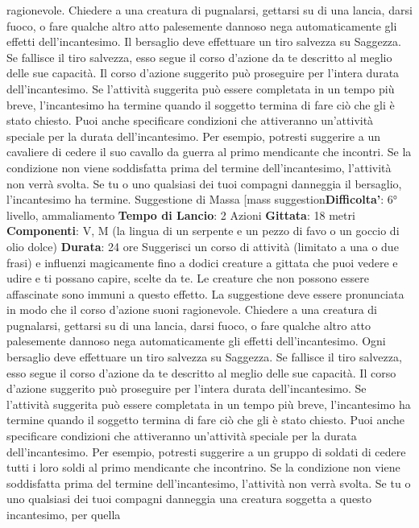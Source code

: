\begin{multicols}{2}
ragionevole. Chiedere a una creatura di pugnalarsi,
gettarsi su di una lancia, darsi fuoco, o fare qualche
altro atto palesemente dannoso nega automaticamente
gli effetti dell’incantesimo.
Il bersaglio deve effettuare un tiro salvezza su
Saggezza. Se fallisce il tiro salvezza, esso segue il
corso d’azione da te descritto al meglio delle sue
capacità. Il corso d’azione suggerito può proseguire per
l’intera durata dell’incantesimo. Se l’attività suggerita
può essere completata in un tempo più breve,
l’incantesimo ha termine quando il soggetto termina di
fare ciò che gli è stato chiesto.
Puoi anche specificare condizioni che attiveranno
un’attività speciale per la durata dell’incantesimo. Per
esempio, potresti suggerire a un cavaliere di cedere il
suo cavallo da guerra al primo mendicante che incontri.
Se la condizione non viene soddisfatta prima del
termine dell’incantesimo, l’attività non verrà svolta.
Se tu o uno qualsiasi dei tuoi compagni danneggia il
bersaglio, l’incantesimo ha termine.
Suggestione di Massa
[mass suggestion\textbf{Difficolta'}:
6° livello, ammaliamento
\textbf{Tempo di Lancio}: 2 Azioni
\textbf{Gittata}: 18 metri
\textbf{Componenti}: V, M (la lingua di un serpente e un pezzo
di favo o un goccio di olio dolce)
\textbf{Durata}: 24 ore
Suggerisci un corso di attività (limitato a una o due
frasi) e influenzi magicamente fino a dodici creature a
gittata che puoi vedere e udire e ti possano capire,
scelte da te. Le creature che non possono essere
affascinate sono immuni a questo effetto. La
suggestione deve essere pronunciata in modo che il
corso d’azione suoni ragionevole. Chiedere a una
creatura di pugnalarsi, gettarsi su di una lancia, darsi
fuoco, o fare qualche altro atto palesemente dannoso
nega automaticamente gli effetti dell’incantesimo.
Ogni bersaglio deve effettuare un tiro salvezza su
Saggezza. Se fallisce il tiro salvezza, esso segue il
corso d’azione da te descritto al meglio delle sue
capacità. Il corso d’azione suggerito può proseguire per
l’intera durata dell’incantesimo. Se l’attività suggerita
può essere completata in un tempo più breve,
l’incantesimo ha termine quando il soggetto termina di
fare ciò che gli è stato chiesto.
Puoi anche specificare condizioni che attiveranno
un’attività speciale per la durata dell’incantesimo. Per
esempio, potresti suggerire a un gruppo di soldati di
cedere tutti i loro soldi al primo mendicante che
incontrino. Se la condizione non viene soddisfatta prima
del termine dell’incantesimo, l’attività non verrà svolta.
Se tu o uno qualsiasi dei tuoi compagni danneggia una
creatura soggetta a questo incantesimo, per quella

\end{multicols}
